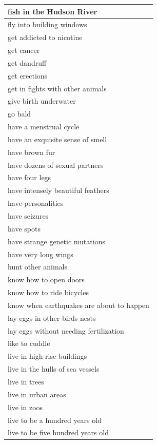 \documentclass[floatsintext,doc]{apa6}
\begin{document}
\begin{longtable}{ |p{3in}|}
   \hline
fish in the Hudson River \\ 
   \hline
fly into building windows \\ 
   \hline
get addicted to nicotine \\ 
   \hline
get cancer \\ 
   \hline
get dandruff \\ 
   \hline
get erections \\ 
   \hline
get in fights with other animals \\ 
   \hline
give birth underwater \\ 
   \hline
go bald \\ 
   \hline
have a menstrual cycle \\ 
   \hline
have an exquisite sense of smell \\ 
   \hline
have brown fur \\ 
   \hline
have dozens of sexual partners \\ 
   \hline
have four legs \\ 
   \hline
have intensely beautiful feathers \\ 
   \hline
have personalities \\ 
   \hline
have seizures \\ 
   \hline
have spots \\ 
   \hline
have strange genetic mutations \\ 
   \hline
have very long wings \\ 
   \hline
hunt other animals \\ 
   \hline
know how to open doors \\ 
   \hline
know how to ride bicycles \\ 
   \hline
know when earthquakes are about to happen \\ 
   \hline
lay eggs in other birds nests \\ 
   \hline
lay eggs without needing fertilization \\ 
   \hline
like to cuddle \\ 
   \hline
live in high-rise buildings \\ 
   \hline
live in the hulls of sea vessels \\ 
   \hline
live in trees \\ 
   \hline
live in urban areas \\ 
   \hline
live in zoos \\ 
   \hline
live to be a hundred years old \\ 
   \hline
live to be five hundred years old \\ 

\end{longtable}
\end{document}
